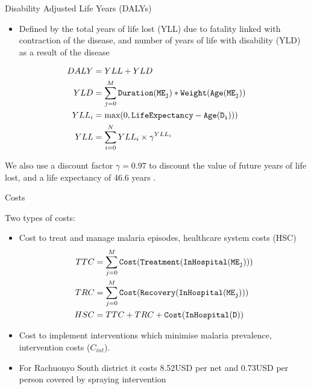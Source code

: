 \documentclass{beamer}
\begin{document}
\begin{frame}{Disability Adjusted Life Years (DALYs)}
\begin{itemize}

\item Defined by the total years of life lost (YLL) due to fatality linked with contraction of the disease, and number of years of life with disability (YLD) as a result of the disease \cite{Murray1996}
\end{itemize}

\begin{align}
DALY &= YLL + YLD \label{eq:daly}\\
YLD &=  \sum_{j=0}^M \tt{Duration}(ME_j)*\tt{Weight}(\tt{Age}(ME_j))\label{eq:yld}\\
YLL_i &=  \mbox{max}(0,\tt{LifeExpectancy} - \tt{Age}(D_i)))\label{eq:ylli}\\
YLL &=  \sum_{i=0}^N YLL_i \times \gamma^{YLL_i} \label{eq:yll}\
\end{align}

We also use a discount factor $\gamma = 0.97$ to discount the value of future years of life lost, and a life expectancy of 46.6 years \cite{network2004indepth}.



\end{frame}



\begin{frame}{Costs}

Two types of costs:

\begin{itemize}
\item Cost to treat and manage malaria episodes, healthcare system costs (HSC)
\begin{align}
	TTC &=  \sum_{j=0}^M \tt{Cost}(\tt{Treatment}(\tt{InHospital}(ME_j))) \label{ttc}\\
	TRC &=  \sum_{j=0}^M \tt{Cost}(\tt{Recovery}(\tt{InHospital}(ME_j)))\label{trc}\\
	HSC&= TTC + TRC + \tt{Cost}(\tt{InHospital}(D))\label{total}
\end{align}
\item Cost to implement interventions which minimise malaria prevalence, intervention costs ($C_{int}$).
\item For Rachuonyo South district it costs 8.52USD per net and 0.73USD per person covered by spraying intervention \cite{Stuckey2014}
\end{itemize}
\end{frame}
\end{document}
